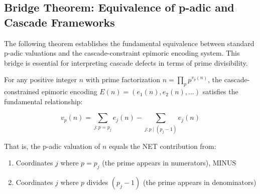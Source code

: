 \subsection{Bridge Theorem: Equivalence of p-adic and Cascade Frameworks}
\label{subsec:padic-cascade-bridge}

The following theorem establishes the fundamental equivalence between standard p-adic valuations and the cascade-constraint epimoric encoding system. This bridge is essential for interpreting cascade defects in terms of prime divisibility.

\begin{theorem}
\label{thm:padic-cascade-equivalence}

For any positive integer $n$ with prime factorization $n = \prod_p p^{v_p(n)}$, the cascade-constrained epimoric encoding $E(n) = (e_1(n), e_2(n), \ldots)$ satisfies the fundamental relationship:

\begin{equation}
\label{eq:padic-cascade-relationship}
v_p(n) = \sum_{j: p = p_j} e_j(n) - \sum_{j: p \mid (p_j - 1)} e_j(n)
\end{equation}

That is, the p-adic valuation of $n$ equals the NET contribution from:
\begin{enumerate}
\item Coordinates $j$ where $p = p_j$ (the prime appears in numerators), MINUS
\item Coordinates $j$ where $p$ divides $(p_j - 1)$ (the prime appears in denominators)
\end{enumerate}

\end{theorem}

